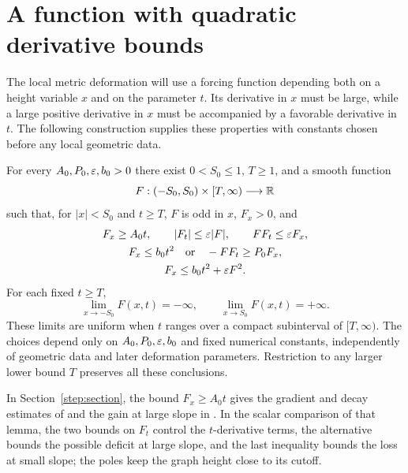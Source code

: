 \section{A function with quadratic derivative bounds}
\label{forcing:section}

The local metric deformation will use a forcing function depending both on a height
variable $x$ and on the parameter $t$.  Its derivative in $x$ must be
large, while a large positive derivative in $x$ must be accompanied by a
favorable derivative in $t$.  The following construction supplies these
properties with constants chosen before any local geometric data.

\begin{theorem}\label{forcing:derivative-bounds}
For every $A_0,P_0,\varepsilon,b_0>0$ there exist $0<S_0\le1$, $T\ge1$, and a
smooth function
\[
 F:(-S_0,S_0)\times[T,\infty)\longrightarrow\mathbb R
\]
such that, for $|x|<S_0$ and $t\ge T$, $F$ is odd in $x$,
$F_x>0$, and
\begin{equation}\label{forcing:estimates}
\begin{gathered}
 F_x\ge A_0t,\qquad |F_t|\le\varepsilon|F|,\qquad FF_t\le\varepsilon F_x,\\
 F_x\le b_0t^2\quad\text{or}\quad -FF_t\ge P_0F_x,\\
 F_x\le b_0t^2+\varepsilon F^2.
\end{gathered}
\end{equation}
For each fixed $t\ge T$,
\[
 \lim_{x\to-S_0}F(x,t)=-\infty,
 \qquad \lim_{x\to S_0}F(x,t)=+\infty.
\]
These limits are uniform when $t$ ranges over a compact subinterval of
$[T,\infty)$.  The choices depend only on $A_0,P_0,\varepsilon,b_0$ and fixed numerical
constants, independently of geometric data and later deformation
parameters. Restriction to any larger lower bound $T$ preserves all
these conclusions.
\end{theorem}

In Section~\ref{step:section}, the bound $F_x\ge A_0t$ gives the gradient
and decay estimates of  and the gain at
large slope in .  In the scalar comparison of that
lemma, the two bounds on $F_t$ control the $t$-derivative terms, the
alternative bounds the possible deficit at large slope, and the last
inequality bounds the loss at small slope; the poles keep the graph height
close to its cutoff.

